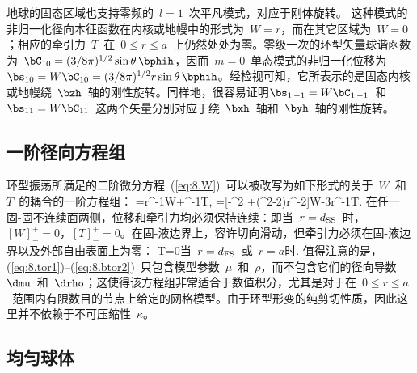 地球的固态区域也支持零频的~$l=1$~次平凡模式，对应于刚体旋转。
%
%
这种模式的非归一化径向本征函数在内核或地幔中的形式为~$W=r$，而在其它区域为~$W=0$；相应的牵引力~$T$~在~$0\leq r\leq a$~上仍然处处为零。零级一次的环型矢量球谐函数为~$\bC_{10}=
(3/8\pi)^{1/2}\sin\theta\,\bphih$，因而~$m=0$~单态模式的非归一化位移为~$\bs_{10}=W\bC_{10}=(3/8\pi)^{1/2}r\sin\theta\,\bphih$。经检视可知，它所表示的是固态内核或地幔绕~$\bzh$~轴的刚性旋转。同样地，很容易证明$\bs_{1\,-1}=W\bC_{1\,-1}$~和~$\bs_{11}=W\bC_{11}$~这两个矢量分别对应于绕~$\bxh$~轴和~$\byh$~轴的刚性旋转。
%
%

\subsection{一阶径向方程组}
%

环型振荡所满足的二阶微分方程~(\ref{eq:8.W})~可以被改写为如下形式的关于~$W$~和~$T$~的耦合的一阶方程组：
\eq
\dW=r^{-1}W+\mu^{-1}T,
\label{eq:8.tor1}
\en
\eq
\dT=[-\om^{2\!}\rho
+(\sqL^2-2)\mu r^{-2}]W-3r^{-1}T.
\label{eq:8.tor2}
\en
在任一固-固不连续面两侧，位移和牵引力均必须保持连续：即当~$r=d_{\rm SS}$~时，$[W]_-^+=0$，$[T]_-^+=0$。在固-液边界上，容许切向滑动，但牵引力必须在固-液边界以及外部自由表面上为零：
%
\eq
T=0\quad\mbox{当 $r=d_{\rm FS}$ 或 $r=a$时.}
\label{eq:8.btor2}
\en
值得注意的是，(\ref{eq:8.tor1})--(\ref{eq:8.btor2})~只包含模型参数~$\mu$~和~$\rho$，而不包含它们的径向导数~$\dmu$~和~$\drho$；这使得该方程组非常适合于数值积分，尤其是对于在~$0\leq r\leq a$~范围内有限数目的节点上给定的网格模型。由于环型形变的纯剪切性质，因此这里并不依赖于不可压缩性~$\kappa$。
%

\renewcommand{\thesubsection}{$\!\!\!\raise1.3ex\hbox{$\star$}\!\!$
\arabic{chapter}.\arabic{section}.\arabic{subsection}}
\subsection{均匀球体}
%
\renewcommand{\thesubsection}{\arabic{chapter}.\arabic{section}.\arabic{subsection}}

